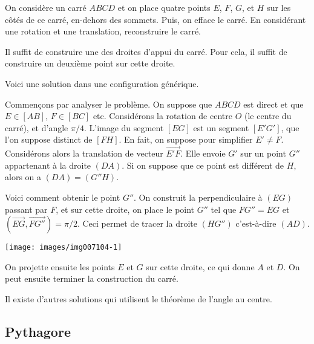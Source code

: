 \begin{exo}
On considère un carré $ABCD$ et on place quatre points $E$, $F$, $G$, et $H$ sur les côtés de ce carré, en-dehors des sommets. Puis, on efface le carré. En considérant une rotation et une translation, reconstruire le carré.

\begin{hint}   
Il suffit de construire une des droites d'appui du carré. Pour cela, il suffit de construire un deuxième point sur cette droite.
\end{hint}
\begin{sol}
Voici une solution dans une configuration \og générique\fg.

Commençons par analyser le problème. On suppose que $ABCD$ est direct et que $E\in [AB]$, $F \in [BC]$ etc.
Considérons la rotation de centre $O$ (le centre du carré), et d'angle $\pi/4$. L'image du segment $[EG]$ est un segment $[E'G']$, que l'on suppose distinct de $[FH]$. En fait, on suppose pour simplifier $E'\neq F$. Considérons alors la translation de vecteur $\overrightarrow{E'F}$. Elle envoie $G'$ sur un point $G''$ appartenant à la droite $(DA)$. Si on suppose que ce point est différent de $H$, alors on a $(DA) = (G''H)$. 

Voici comment obtenir le point $G''$. On construit la perpendiculaire à $(EG)$ passant par $F$, et sur cette droite, on place le point $G''$ tel que $FG''=EG$ et $(\overrightarrow{EG},\overrightarrow{FG''}) = \pi/2$. Ceci permet de tracer la droite $(HG'')$ c'est-à-dire $(AD)$.

\begin{center}
\texttt{[image: images/img007104-1]}
\end{center}

On projette ensuite les points $E$ et $G$ sur cette droite, ce qui donne $A$ et $D$. On peut ensuite terminer la construction du carré.

Il existe d'autres solutions qui utilisent le théorème de l'angle au centre.
\end{sol} 
\end{exo}  


\subsection{Pythagore}

